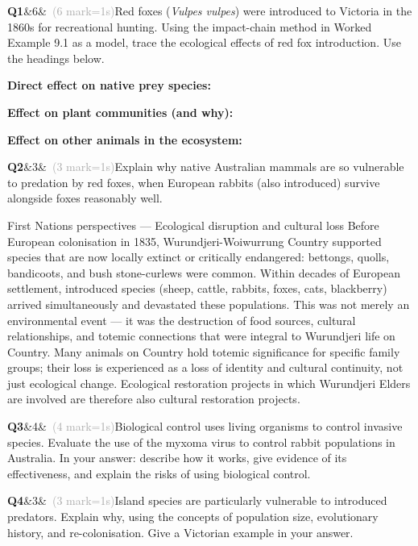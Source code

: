 \documentclass[11pt,a4paper]{article}
\newcommand{\answerbox}[1]{%
  \begin{tcolorbox}[
    enhanced, breakable, arc=2mm,
    colback=Paper, colframe=Line,
    left=2mm, right=2mm, top=1mm, bottom=1mm,
    boxrule=1pt,
    height=#1
  ]
  \end{tcolorbox}%
}
\newcommand{\question}[3]{%
  \needspace{3\baselineskip}%
  \medskip
  \noindent\textbf{Q#1}\ifx&#2&\else\ \textcolor{DarkGrey}{(#2 mark\ifnum#2=1\else s\fi)}\fi\quad #3%
  \medskip
}
\begin{document}
\begin{yr7box}
\question{1}{6}{Red foxes (\textit{Vulpes vulpes}) were introduced to Victoria in the 1860s for recreational hunting. Using the impact-chain method in Worked Example 9.1 as a model, trace the ecological effects of red fox introduction. Use the headings below.}

\medskip
\textbf{Direct effect on native prey species:}
\answerbox{4cm}

\textbf{Effect on plant communities (and why):}
\answerbox{4cm}
\newpage
\textbf{Effect on other animals in the ecosystem:}
\answerbox{4cm}

\question{2}{3}{Explain why native Australian mammals are so vulnerable to predation by red foxes, when European rabbits (also introduced) survive alongside foxes reasonably well.}
\answerbox{3.5cm}
\end{yr7box}

\begin{fnbox}{First Nations perspectives --- Ecological disruption and cultural loss}
Before European colonisation in 1835, Wurundjeri-Woiwurrung Country supported species that are now locally extinct or critically endangered: bettongs, quolls, bandicoots, and bush stone-curlews were common. Within decades of European settlement, introduced species (sheep, cattle, rabbits, foxes, cats, blackberry) arrived simultaneously and devastated these populations. This was not merely an environmental event --- it was the destruction of food sources, cultural relationships, and totemic connections that were integral to Wurundjeri life on Country. Many animals on Country hold totemic significance for specific family groups; their loss is experienced as a loss of identity and cultural continuity, not just ecological change. Ecological restoration projects in which Wurundjeri Elders are involved are therefore also cultural restoration projects.
\end{fnbox}

\begin{yr8box}
\question{3}{4}{Biological control uses living organisms to control invasive species. Evaluate the use of the myxoma virus to control rabbit populations in Australia. In your answer: describe how it works, give evidence of its effectiveness, and explain the risks of using biological control.}
\answerbox{5cm}

\question{4}{3}{Island species are particularly vulnerable to introduced predators. Explain why, using the concepts of population size, evolutionary history, and re-colonisation. Give a Victorian example in your answer.}
\answerbox{4cm}
\end{yr8box}
\end{document}
